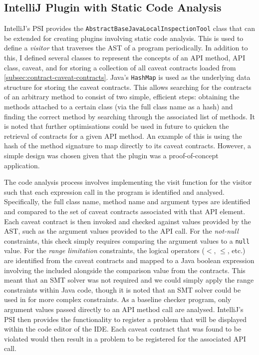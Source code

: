 \subsection{IntelliJ Plugin with Static Code Analysis}
\label{subsec:contract-plugin}
IntelliJ's PSI provides the \lstinline{AbstractBaseJavaLocalInspectionTool} class that can be extended for creating plugins involving static code analysis. This is used to define a \textit{visitor} that traverses the AST of a program periodically. In addition to this, I defined several classes to represent the concepts of an API method, API class, caveat, and for storing a collection of all caveat contracts loaded from \ref{subsec:contract-caveat-contracts}. Java's \lstinline{HashMap} is used as the underlying data structure for storing the caveat contracts. This allows searching for the contracts of an arbitrary method to consist of two simple, efficient steps: obtaining the methods attached to a certain class (via the full class name as a hash) and finding the correct method by searching through the associated list of methods. It is noted that further optimisations could be used in future to quicken the retrieval of contracts for a given API method. An example of this is using the hash of the method signature to map directly to its caveat contracts. However, a simple design was chosen given that the plugin was a proof-of-concept application. \bigbreak

The code analysis process involves implementing the visit function for the visitor such that each expression call in the program is identified and analysed. Specifically, the full class name, method name and argument types are identified and compared to the set of caveat contracts associated with that API element. Each caveat contract is then invoked and checked against values provided by the AST, such as the argument values provided to the API call. For the \textit{not-null} constraints, this check simply requires comparing the argument values to a \lstinline{null} value. For the \textit{range limitation} constraints, the logical operators ($<$, $\leq$, etc.) are identified from the caveat contracts and mapped to a Java boolean expression involving the included alongside the comparison value from the contracts. This meant that an SMT solver was not required and we could simply apply the range constraints within Java code, though it is noted that an SMT solver could be used in for more complex constraints. As a baseline checker program, only argument values passed directly to an API method call are analysed. IntelliJ's PSI then provides the functionality to register a problem that will be displayed within the code editor of the IDE. Each caveat contract that was found to be violated would then result in a problem to be registered for the associated API call.

